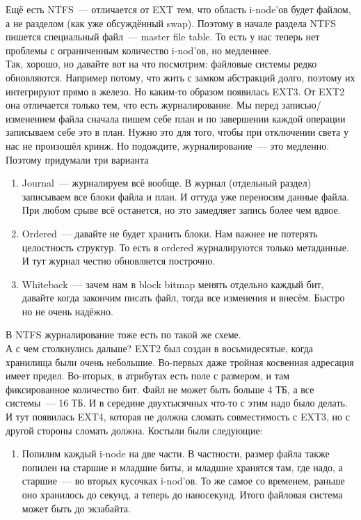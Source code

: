 \documentclass{article}
\begin{document}
\begin{enumerate}
        Ещё есть NTFS~--- отличается от EXT тем, что область i-node'ов будет файлом, а не разделом (как уже обсуждённый swap). Поэтому в начале раздела NTFS пишется специальный файл~--- master file table. То есть у нас теперь нет проблемы с ограниченным количество i-nod'ов, но медленнее.\\
        Так, хорошо, но давайте вот на что посмотрим: файловые системы редко обновляются. Например потому, что жить с замком абстракций долго, поэтому их интегрируют прямо в железо. Но каким-то образом появилась EXT3. От EXT2 она отличается только тем, что есть журналирование. Мы перед записью/изменением файла сначала пишем себе план и по завершении каждой операции записываем себе это в план. Нужно это для того, чтобы при отключении света у нас не произошёл кринж. Но подождите, журналирование~--- это медленно. Поэтому придумали три варианта
        \begin{enumerate}
            \item Journal~--- журналируем всё вообще. В журнал (отдельный раздел) записываем все блоки файла и план. И оттуда уже переносим данные файла. При любом срыве всё останется, но это замедляет запись более чем вдвое.
            \item Ordered~--- давайте не будет хранить блоки. Нам важнее не потерять целостность структур. То есть в ordered журналируются только метаданные. И тут журнал честно обновляется построчно.
            \item Whiteback~--- зачем нам в block bitmap менять отдельно каждый бит, давайте когда закончим писать файл, тогда все изменения и внесём. Быстро но не очень надёжно.
        \end{enumerate}
        В NTFS журналирование тоже есть по такой же схеме.\\
        А с чем столкнулись дальше? EXT2 был создан в восьмидесятые, когда хранилища были очень небольшие. Во-первых даже тройная косвенная адресация имеет предел. Во-вторых, в атрибутах есть поле с размером, и там фиксированное количество бит. Файл не может быть больше 4 ТБ, а все системы~--- 16 ТБ. И в середине двухтысячных что-то с этим надо было делать. И тут появилась EXT4, которая не должна сломать совместимость с EXT3, но с другой стороны сломать должна. Костыли были следующие:
        \begin{enumerate}
            \item Попилим каждый i-node на две части. В частности, размер файла также попилен на старшие и младшие биты, и младшие хранятся там, где надо, а старшие~--- во вторых кусочках i-nod'ов. То же самое со временем, раньше оно хранилось до секунд, а теперь до наносекунд. Итого файловая система может быть до экзабайта.

\end{enumerate}
\end{enumerate}
\end{document}
